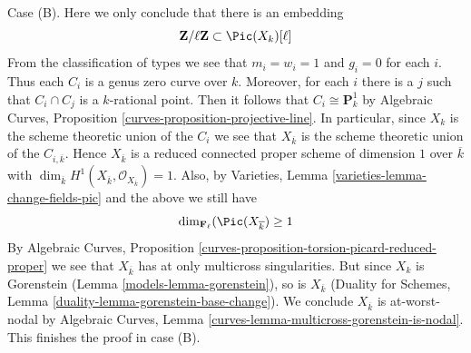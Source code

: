 \medskip\noindent
Case (B). Here we only conclude that there is an embedding
$$
\mathbf{Z}/\ell \mathbf{Z} \subset \Pic(X_k)[\ell]
$$
From the classification of types we see that $m_i = w_i = 1$ and $g_i = 0$
for each $i$. Thus each $C_i$ is a genus zero curve over $k$.
Moreover, for each $i$ there is a $j$ such that
$C_i \cap C_j$ is a $k$-rational point. Then it follows that
$C_i \cong \mathbf{P}^1_k$ by
Algebraic Curves, Proposition \ref{curves-proposition-projective-line}.
In particular, since $X_k$ is the scheme theoretic union of the
$C_i$ we see that $X_{\overline{k}}$ is the
scheme theoretic union of the $C_{i, \overline{k}}$.
Hence $X_{\overline{k}}$ is a reduced connected proper
scheme of dimension $1$ over $\overline{k}$ with $\dim_{\overline{k}}
H^1(X_{\overline{k}}, \mathcal{O}_{X_{\overline{k}}}) = 1$.
Also, by Varieties, Lemma \ref{varieties-lemma-change-fields-pic}
and the above we still have
$$
\dim_{\mathbf{F}_\ell}(\Pic(X_{\overline{k}}) \geq 1
$$
By Algebraic Curves, Proposition
\ref{curves-proposition-torsion-picard-reduced-proper}
we see that $X_{\overline{k}}$ has at only multicross singularities.
But since $X_k$ is Gorenstein (Lemma \ref{models-lemma-gorenstein}),
so is $X_{\overline{k}}$ (Duality for Schemes, Lemma
\ref{duality-lemma-gorenstein-base-change}).
We conclude $X_{\overline{k}}$ is at-worst-nodal by
Algebraic Curves, Lemma \ref{curves-lemma-multicross-gorenstein-is-nodal}.
This finishes the proof in case (B).


